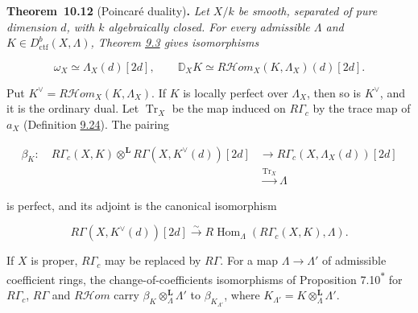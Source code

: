 \documentclass[11pt]{article}
\newenvironment{bpstatement}[2]{\par\addvspace{0.6\baselineskip}\noindent\textbf{#1}#2\textbf{.}\enspace\ignorespaces}
  {\par\addvspace{0.4\baselineskip}}
\newenvironment{bpstatementit}[2]{\begin{bpstatement}{#1}{#2}\itshape\ignorespaces}{\end{bpstatement}}
\newcommand{\bpout}[1]{#1\textsuperscript{\hyperlink{bp-outside}{\ensuremath{\ast}}}}
\providecommand{\cHom}{}\renewcommand{\cHom}{R\mathcal{H}\!om}
\begin{document}
\label{bp137}%
\begin{bpstatementit}{Theorem~10.12}{ (Poincaré duality)}
Let \(X/k\) be smooth, separated of pure dimension \(d\), with \(k\) algebraically closed. For every admissible \(\Lambda\) and \(K\in D^b_{\mathrm{ctf}}(X,\Lambda)\), Theorem \hyperref[bp11]{9.3} gives isomorphisms

\[
\omega_X\simeq\Lambda_X(d)[2d],\qquad
\mathbb D_XK\simeq
\cHom_X(K,\Lambda_X)(d)[2d].
\]

Put \(K^\vee=\cHom_X(K,\Lambda_X)\). If \(K\) is locally perfect over \(\Lambda_X\), then so is \(K^\vee\), and it is the ordinary dual. Let \(\operatorname{Tr}_X\) be the map induced on \(R\Gamma_c\) by the trace map of \(a_X\) (Definition \hyperref[bp85]{9.24}). The pairing

\[
\begin{split}
\beta_K:\quad
R\Gamma_c(X,K)\otimes^{\mathbf L}
R\Gamma(X,K^\vee(d))[2d]
&\longrightarrow R\Gamma_c(X,\Lambda_X(d))[2d]\\
&\xrightarrow{\operatorname{Tr}_X}\Lambda
\end{split}
\tag{10.7}
\]

is perfect, and its adjoint is the canonical isomorphism

\[
R\Gamma(X,K^\vee(d))[2d]
\xrightarrow{\sim}
R\!\operatorname{Hom}_\Lambda(R\Gamma_c(X,K),\Lambda).
\tag{10.8}
\]

If \(X\) is proper, \(R\Gamma_c\) may be replaced by \(R\Gamma\). For a map \(\Lambda\to\Lambda'\) of admissible coefficient rings, the change-of-coefficients isomorphisms of Proposition \bpout{7.10} for \(R\Gamma_c\), \(R\Gamma\) and \(\cHom\) carry \(\beta_K\otimes^{\mathbf L}_\Lambda\Lambda'\) to \(\beta_{K_{\Lambda'}}\), where \(K_{\Lambda'}=K\otimes^{\mathbf L}_\Lambda\Lambda'\).
\end{bpstatementit}
\end{document}
